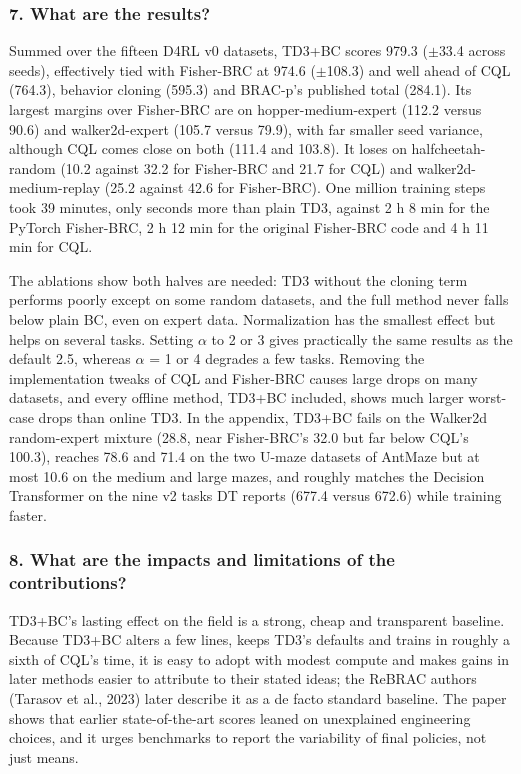 \documentclass[11pt]{article}
\newcommand{\question}[1]{\subsubsection*{#1}}
\begin{document}
\question{7. What are the results?}

Summed over the fifteen D4RL v0 datasets, TD3+BC scores 979.3 (\ensuremath{\pm}33.4 across seeds), effectively tied with Fisher-BRC at 974.6 (\ensuremath{\pm}108.3) and well ahead of CQL (764.3), behavior cloning (595.3) and BRAC-p's published total (284.1). Its largest margins over Fisher-BRC are on hopper-medium-expert (112.2 versus 90.6) and walker2d-expert (105.7 versus 79.9), with far smaller seed variance, although CQL comes close on both (111.4 and 103.8). It loses on halfcheetah-random (10.2 against 32.2 for Fisher-BRC and 21.7 for CQL) and walker2d-medium-replay (25.2 against 42.6 for Fisher-BRC). One million training steps took 39 minutes, only seconds more than plain TD3, against 2 h 8 min for the PyTorch Fisher-BRC, 2 h 12 min for the original Fisher-BRC code and 4 h 11 min for CQL.

The ablations show both halves are needed: TD3 without the cloning term performs poorly except on some random datasets, and the full method never falls below plain BC, even on expert data. Normalization has the smallest effect but helps on several tasks. Setting \ensuremath{\alpha} to 2 or 3 gives practically the same results as the default 2.5, whereas \ensuremath{\alpha} = 1 or 4 degrades a few tasks. Removing the implementation tweaks of CQL and Fisher-BRC causes large drops on many datasets, and every offline method, TD3+BC included, shows much larger worst-case drops than online TD3. In the appendix, TD3+BC fails on the Walker2d random-expert mixture (28.8, near Fisher-BRC's 32.0 but far below CQL's 100.3), reaches 78.6 and 71.4 on the two U-maze datasets of AntMaze but at most 10.6 on the medium and large mazes, and roughly matches the Decision Transformer on the nine v2 tasks DT reports (677.4 versus 672.6) while training faster.

\question{8. What are the impacts and limitations of the contributions?}

TD3+BC's lasting effect on the field is a strong, cheap and transparent baseline. Because TD3+BC alters a few lines, keeps TD3's defaults and trains in roughly a sixth of CQL's time, it is easy to adopt with modest compute and makes gains in later methods easier to attribute to their stated ideas; the ReBRAC authors (Tarasov et al., 2023) later describe it as a de facto standard baseline. The paper shows that earlier state-of-the-art scores leaned on unexplained engineering choices, and it urges benchmarks to report the variability of final policies, not just means.
\end{document}
